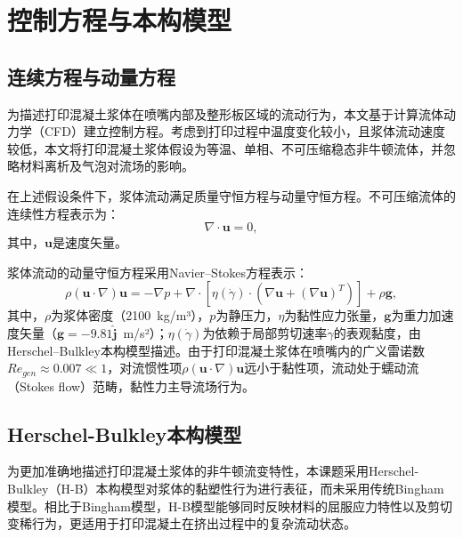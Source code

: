 \section{控制方程与本构模型}

\subsection{连续方程与动量方程}

为描述打印混凝土浆体在喷嘴内部及整形板区域的流动行为，本文基于计算流体动力学（CFD）建立控制方程。考虑到打印过程中温度变化较小，且浆体流动速度较低，本文将打印混凝土浆体假设为等温、单相、不可压缩稳态非牛顿流体，并忽略材料离析及气泡对流场的影响。

在上述假设条件下，浆体流动满足质量守恒方程与动量守恒方程。不可压缩流体的连续性方程表示为：
\begin{equation}\label{eq:continuity}
  \nabla \cdot \mathbf{u} = 0,
\end{equation}
其中，$\mathbf{u}$是速度矢量。

浆体流动的动量守恒方程采用Navier--Stokes方程表示：
\begin{equation}\label{eq:NS}
  \rho (\mathbf{u} \cdot \nabla) \mathbf{u} = -\nabla p + \nabla \cdot \left[ \eta(\dot{\gamma}) \cdot (\nabla \mathbf{u} + (\nabla \mathbf{u})^T) \right] + \rho \mathbf{g},
\end{equation}
其中，$\rho$为浆体密度（2100~kg/m³），$p$为静压力，$\eta$为黏性应力张量，$\mathbf{g}$为重力加速度矢量（$\mathbf{g} = -9.81 \hat{\mathbf{j}}$~m/s²）；$\eta(\dot{\gamma})$为依赖于局部剪切速率$\dot{\gamma}$的表观黏度，由Herschel--Bulkley本构模型描述。由于打印混凝土浆体在喷嘴内的广义雷诺数$Re_{gen} \approx 0.007 \ll 1$，对流惯性项$\rho(\mathbf{u} \cdot \nabla)\mathbf{u}$远小于黏性项，流动处于蠕动流（Stokes flow）范畴，黏性力主导流场行为。

\subsection{Herschel-Bulkley本构模型}

为更加准确地描述打印混凝土浆体的非牛顿流变特性，本课题采用Herschel-Bulkley（H-B）本构模型对浆体的黏塑性行为进行表征，而未采用传统Bingham模型。相比于Bingham模型，H-B模型能够同时反映材料的屈服应力特性以及剪切变稀行为，更适用于打印混凝土在挤出过程中的复杂流动状态。

